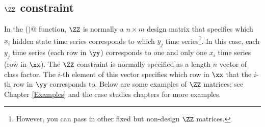 \subsection{$\ZZ$ constraint}
In the \verb@MARSS()@ function, $\ZZ$ is normally a $n \times m$ design matrix that specifies which $x_i$ hidden state time series corresponds to which $y_j$ time series\footnote{However, you can pass in other fixed but non-design $\ZZ$ matrices.}.  In this case, each $y_j$ time series (each row in $\yy$) corresponds to one and only one $x_i$ time series (row in $\xx$).  The $\ZZ$ constraint is normally specified as a length $n$ vector of class factor. The $i$-th element of this vector specifies which row in $\xx$ that the $i$-th row in $\yy$ corresponds to.   Below are some examples of $\ZZ$ matrices; see Chapter \ref{Examples} and the case studies chapters for more examples.
